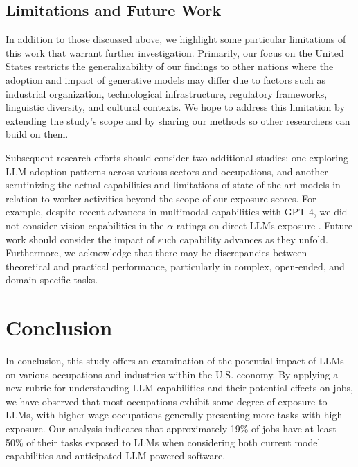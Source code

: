 \documentclass[11pt]{article}
\begin{document}
\subsection{Limitations and Future Work}

In addition to those discussed above, we highlight some particular limitations of this work that warrant further investigation. Primarily, our focus on the United States restricts the generalizability of our findings to other nations where the adoption and impact of generative models may differ due to factors such as industrial organization, technological infrastructure, regulatory frameworks, linguistic diversity, and cultural contexts. We hope to address this limitation by extending the study's scope and by sharing our methods so other researchers can build on them.

Subsequent research efforts should consider two additional studies: one exploring LLM adoption patterns across various sectors and occupations, and another scrutinizing the actual capabilities and limitations of state-of-the-art models in relation to worker activities beyond the scope of our exposure scores. For example, despite recent advances in multimodal capabilities with GPT-4, we did not consider vision capabilities in the $\alpha$ ratings on direct LLMs-exposure \citep{gpt4}. Future work should consider the impact of such capability advances as they unfold. Furthermore, we acknowledge that there may be discrepancies between theoretical and practical performance, particularly in complex, open-ended, and domain-specific tasks. 


\section{Conclusion}
\label{sec:conclusion}

In conclusion, this study offers an examination of the potential impact of LLMs on various occupations and industries within the U.S. economy. By applying a new rubric for understanding LLM capabilities and their potential effects on jobs, we have observed that most occupations exhibit some degree of exposure to LLMs, with higher-wage occupations generally presenting more tasks with high exposure. Our analysis indicates that approximately 19\% of jobs have at least 50\% of their tasks exposed to LLMs when considering both current model capabilities and anticipated LLM-powered software. 
\end{document}
